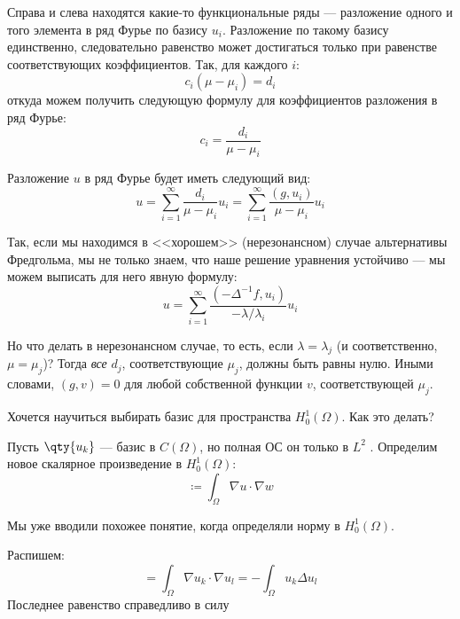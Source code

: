 Справа и слева находятся какие-то функциональные ряды --- разложение одного и того элемента в ряд Фурье по базису $u_i$. Разложение по такому базису единственно, следовательно равенство может достигаться только при равенстве соответствующих коэффициентов. Так, для каждого $i$:
\begin{equation}
  c_i(\mu - \mu_i) = d_i
\end{equation}
откуда можем получить следующую формулу для коэффициентов разложения в ряд Фурье:
\begin{equation}
  \boxed{c_i = \frac{d_i}{\mu - \mu_i}}
\end{equation}

Разложение $u$ в ряд Фурье будет иметь следующий вид:
\begin{equation}
  u = \sum_{i=1}^\infty \frac{d_i}{\mu - \mu_i} u_i = \sum_{i=1}^\infty \frac{(g, u_i)}{\mu - \mu_i} u_i
\end{equation}

Так, если мы находимся в <<хорошем>> (нерезонансном) случае альтернативы Фредгольма, мы не только знаем, что наше решение уравнения  устойчиво --- мы можем выписать для него явную формулу:
\begin{equation}
  u = \sum_{i=1}^\infty \frac{(-\Delta^{-1} f, u_i)}{-\lambda / \lambda_i} u_i
\end{equation}

Но что делать в нерезонансном случае, то есть, если $\lambda = \lambda_j$ (и соответственно, $\mu = \mu_j$)? Тогда \emph{все} $d_j$, соответствующие $\mu_j$, должны быть равны нулю. Иными словами, $(g, v) = 0$ для любой собственной функции $v$, соответствующей $\mu_j$.


Хочется научиться выбирать базис для пространства $H_0^1(\Omega)$. Как это делать?

Пусть $\qty{u_k}$ --- базис в $C(\Omega)$, но полная ОС он только в $L^2$ . Определим новое скалярное произведение в $H_0^1(\Omega)$:
\begin{equation}
  [u, w] \coloneqq \int_\Omega \nabla u \cdot \nabla w
\end{equation}

Мы уже вводили похожее понятие, когда определяли норму в $H_0^1(\Omega)$.

Распишем:
\begin{equation}
  [u_k, u_l] = \int_\Omega \nabla u_k \cdot \nabla u_l = -\int_\Omega u_k \Delta u_l
\end{equation}
Последнее равенство справедливо в силу 

